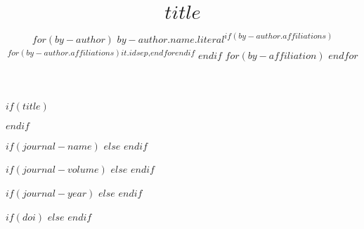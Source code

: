
$if(title)$
\title{$title$}
$endif$

\author{
$for(by-author)$
$by-author.name.literal$\textsuperscript{$if(by-author.affiliations)$$for(by-author.affiliations)$$it.id$$sep$,$endfor$$endif$}
$endif$
$for(by-affiliation)$
$endfor$
}

$if(journal-name)$
$else$
$endif$

$if(journal-volume)$
$else$
$endif$

$if(journal-year)$
$else$
$endif$

$if(doi)$
$else$
$endif$
